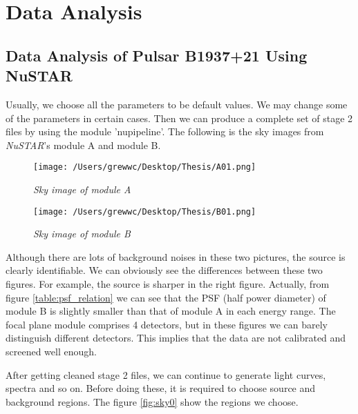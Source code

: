 \documentclass[12pt]{report}
\begin{document}
\chapter{Data Analysis}
    
    
    \section{Data Analysis of Pulsar B1937+21 Using NuSTAR}
        Usually, we choose all the parameters to be default values. We may change some of the parameters in certain 
        cases. 
        Then we can produce a complete set of stage 2 files by using the module 'nupipeline'. The following is 
        the sky images from \textit{NuSTAR}'s module A and module B. 
        \begin{figure}[h]
          \hspace{0.7cm}
          \begin{minipage}{0.45\textwidth} 
            \centering 
            \texttt{[image: /Users/grewwc/Desktop/Thesis/A01.png]}
            \caption{\textit{\footnotesize Sky image of module A}}
          \end{minipage}
          \hspace{0.1cm} 
          \begin{minipage}{0.52\textwidth}
            \centering 
            \texttt{[image: /Users/grewwc/Desktop/Thesis/B01.png]}
            \caption{\textit{\footnotesize Sky image of module B}}
          \end{minipage}
        \end{figure}
      
        Although there are lots of background noises in these two pictures, the source is clearly identifiable. 
        We can obviously see the differences between these two figures. For example, the source is sharper in the 
        right figure. Actually, from figure \ref{table:psf_relation} we can see that the PSF (half power diameter) of
        module B is slightly smaller than that of module A in each energy range. 
        The focal plane module comprises 4 detectors, but in these figures we can barely distinguish different 
        detectors. This implies that the data are not calibrated and screened well enough. 

        \indent After getting cleaned stage 2 files, we can continue to generate light curves, spectra and so on. 
        Before doing these, it is required to choose source and background regions. The figure \ref{fig:sky0}
        show the regions we choose.  
\end{document}
